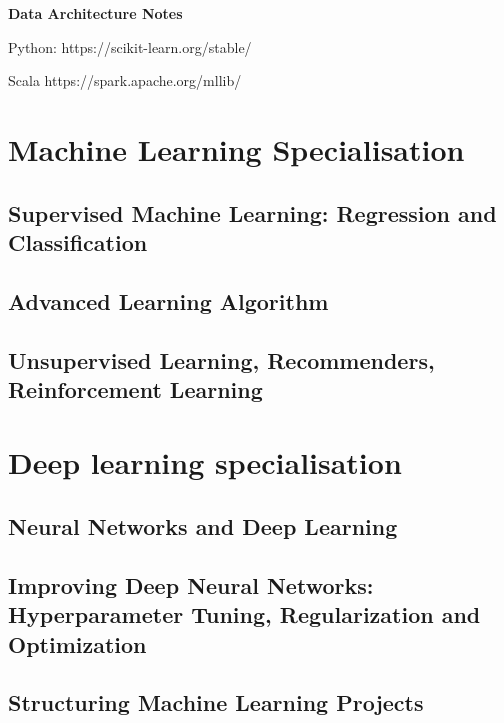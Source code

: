 \documentclass[a4paper, 11pt]{book}
\begin{document}
    \begin{titlepage}
        \centering
        \vspace*{2in}
        \Huge \textbf{Data Architecture Notes}
    \end{titlepage}

    \setcounter{section}{0}

    \newpage

    \tableofcontents
    \newpage

    \listoffigures
    \newpage

    Python:
    https://scikit-learn.org/stable/

    Scala
    https://spark.apache.org/mllib/

    \part{Machine Learning Specialisation}
    \chapter{Supervised Machine Learning: Regression and Classification}
    \chapter{Advanced Learning Algorithm}
    \chapter{Unsupervised Learning, Recommenders, Reinforcement Learning}

    \part{Deep learning specialisation}
    \chapter{Neural Networks and Deep Learning}
    \chapter{Improving Deep Neural Networks: Hyperparameter Tuning, Regularization and Optimization}
    \chapter{Structuring Machine Learning Projects}
\end{document}
